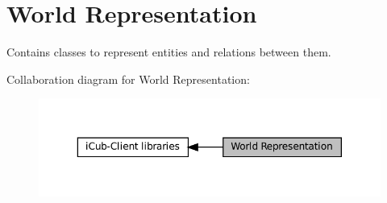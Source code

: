 \hypertarget{group__icubclient__representations}{}\section{World Representation}
\label{group__icubclient__representations}


Contains classes to represent entities and relations between them.  


Collaboration diagram for World Representation\+:
\nopagebreak
\begin{figure}[H]
\begin{center}
\leavevmode
\includegraphics[width=350pt]{group__icubclient__representations}
\end{center}
\end{figure}
